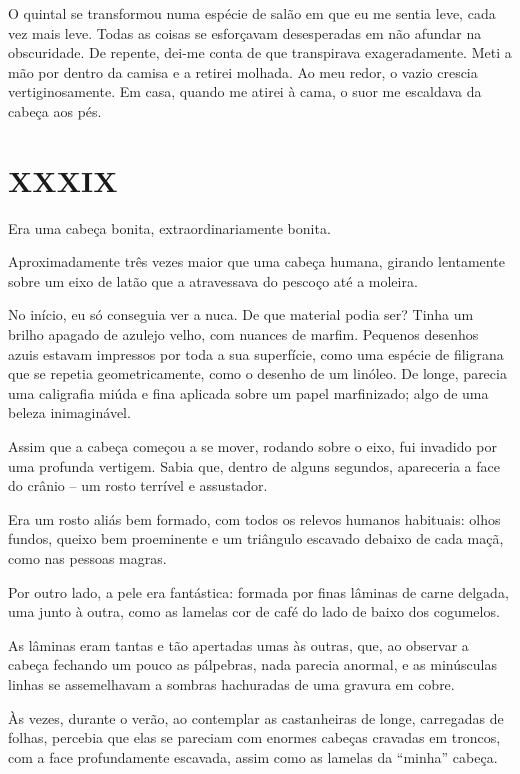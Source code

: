 O quintal se transformou numa espécie de salão em que eu me sentia leve, cada vez mais leve. Todas as coisas se esforçavam desesperadas em não afundar na obscuridade. De repente, dei-me conta de que transpirava exageradamente. Meti a mão por dentro da camisa e a retirei molhada. Ao meu redor, o vazio crescia vertiginosamente. Em casa, quando me atirei à cama, o suor me escaldava da cabeça aos pés.


\chapter*{\centering\Large{XXXIX}}

Era uma cabeça bonita, extraordinariamente bonita.

Aproximadamente três vezes maior que uma cabeça humana, girando lentamente sobre um eixo de latão que a atravessava do pescoço até a moleira. 

No início, eu só conseguia ver a nuca. De que material podia ser? Tinha um brilho apagado de azulejo velho, com nuances de marfim. Pequenos desenhos azuis estavam impressos por toda a sua superfície, como uma espécie de filigrana que se repetia geometricamente, como o desenho de um linóleo. De longe, parecia uma caligrafia miúda e fina aplicada sobre um papel marfinizado; algo de uma beleza inimaginável.

Assim que a cabeça começou a se mover, rodando sobre o eixo, fui invadido por uma profunda vertigem. Sabia que, dentro de alguns segundos, apareceria a face do crânio -- um rosto terrível e assustador.

Era um rosto aliás bem formado, com todos os relevos humanos habituais: olhos fundos, queixo bem proeminente e um triângulo escavado debaixo de cada maçã, como nas pessoas magras.

Por outro lado, a pele era fantástica: formada por finas lâminas de carne delgada, uma junto à outra, como as lamelas cor de café do lado de baixo dos cogumelos.

As lâminas eram tantas e tão apertadas umas às outras, que, ao observar a cabeça fechando um pouco as pálpebras, nada parecia anormal, e as minúsculas linhas se assemelhavam a sombras hachuradas de uma gravura em cobre.

Às vezes, durante o verão, ao contemplar as castanheiras de longe, carregadas de folhas, percebia que elas se pareciam com enormes cabeças cravadas em troncos, com a face profundamente escavada, assim como as lamelas da ``minha'' cabeça.

